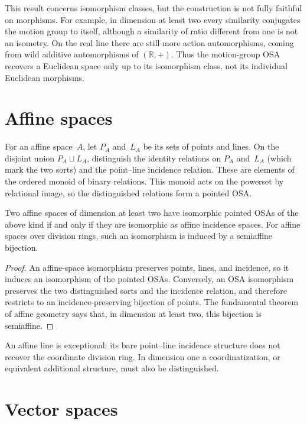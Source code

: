 This result concerns isomorphism classes, but the construction is not fully
faithful on morphisms.  For example, in dimension at least two every
similarity conjugates the motion group to itself, although a similarity of
ratio different from one is not an isometry.  On the real line there are
still more action automorphisms, coming from wild additive automorphisms of
$(\mathbb R,+)$.  Thus the motion-group OSA recovers a Euclidean space only
up to its isomorphism class, not its individual Euclidean morphisms.

\section{Affine spaces}

For an affine space~$A$, let $P_A$ and~$L_A$ be its sets of points and
lines.  On the disjoint union $P_A\sqcup L_A$, distinguish the identity
relations on $P_A$ and~$L_A$ (which mark the two sorts) and the point--line
incidence relation.  These are elements of the ordered monoid of binary
relations.  This monoid acts on the powerset by relational image, so the
distinguished relations form a pointed OSA.

\begin{prop}
Two affine spaces of dimension at least two have isomorphic pointed OSAs of
the above kind if and only if they are isomorphic as affine incidence
spaces.  For affine spaces over division rings, such an isomorphism is
induced by a semiaffine bijection.
\end{prop}

\begin{proof}
An affine-space isomorphism preserves points, lines, and incidence, so it
induces an isomorphism of the pointed OSAs.  Conversely, an OSA
isomorphism preserves the two distinguished sorts and the incidence
relation, and therefore restricts to an incidence-preserving bijection of
points.  The fundamental theorem of affine geometry says that, in
dimension at least two, this bijection is semiaffine.
\end{proof}

An affine line is exceptional: its bare point--line incidence structure
does not recover the coordinate division ring.  In dimension one a
coordinatization, or equivalent additional structure, must also be
distinguished.

\section{Vector spaces}

